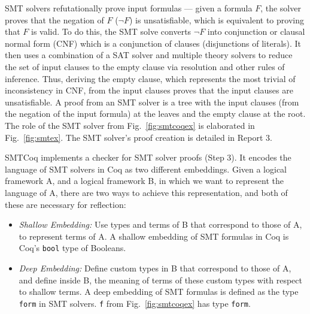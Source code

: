 \documentclass{article}
\begin{document}
	SMT solvers refutationally prove 
	input formulas --- given a formula
	$F$, the solver proves that the 
	negation of $F$ ($\neg F$) is 
	unsatisfiable, which is equivalent
	to proving that $F$ is valid. 
	To do this, the SMT solve converts 
	$\neg F$ into conjunction or clausal 
	normal form (CNF) which is a 
	conjunction of clauses (disjunctions 
	of literals). It then uses 
	a combination of a SAT solver and 
	multiple theory	solvers to reduce 
	the set of input clauses to the 
	empty clause via resolution
	and other rules of inference. Thus,
	deriving the empty clause, which 
	represents the most trivial
	of inconsistency in CNF, from the 
	input clauses proves that the input 
	clauses 
	are unsatisfiable. A proof
	from an SMT solver is a tree 
	with the input clauses (from the 
	negation of the input formula) at
	the leaves and the empty clause
	at the root. The role of the SMT
	solver from Fig.~\ref{fig:smtcoqex}
	is elaborated in Fig.~\ref{fig:smtex}.
	The SMT solver's proof creation is 
	detailed in Report 3.
	
	SMTCoq implements a checker for 
	SMT solver proofs (Step 3). It 
	encodes the language of SMT solvers
	in Coq as two different embeddings. 
	Given a logical framework A, and 
	a logical framework B, in which we 
	want to represent the language of A, 
	there are two ways to achieve this
	representation, and 
	both of these are necessary for 
	reflection:
	\begin{itemize}
		\item \textit{Shallow Embedding: }
		Use types and terms of B that 
		correspond to those of A, to 
		represent terms of A. A shallow
		embedding of SMT formulas in 
		Coq is Coq's \texttt{bool} 
		type of Booleans.
		\item\textit{Deep Embedding: }
		Define custom types in B that 
		correspond to those of A, and 
		define inside B, the meaning of 
		terms of these custom types with 
		respect to shallow terms. A 
		deep embedding of SMT formulas 
		is defined as the type 
		\texttt{form} in SMT solvers.
		\texttt{f} from 
		Fig.~\ref{fig:smtcoqex} has
		type \texttt{form}.
	\end{itemize}
	
\end{document}
